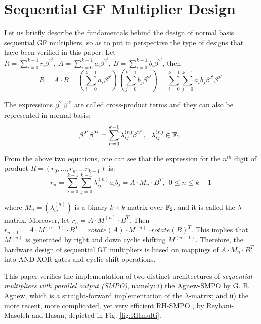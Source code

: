 \section{Sequential GF Multiplier Design}
\label{sec:design}

Let us briefly describe the fundamentals behind the design of normal
basis sequential GF multipliers, so as to put in perspective the type
of designs that have been verified in this paper. Let $R =
\sum_{i=0}^{k-1} r_i \beta^{2^{i}}, ~A = \sum_{i=0}^{k-1} a_i
\beta^{2^{i}}, ~B = \sum_{i=0}^{k-1} b_i \beta^{2^{i}}$, then 
\[
R = A\cdot B = (\sum_{i=0}^{k-1} a_i \beta^{2^{i}}) (\sum_{j=0}^{k-1}
b_j \beta^{2^{j}})  =
\sum_{i=0}^{k-1}\sum_{j=0}^{k-1}a_ib_j\beta^{2^i}\beta^{2^j}\nonumber 
\]

The expressions $\beta^{2^i}\beta^{2^j}$ are called cross-product
terms and they can also be represented in normal basis: 
\begin{displaymath}
\beta^{2^i}\beta^{2^j} =
\sum_{n=0}^{k-1}\lambda_{ij}^{(n)}\beta^{2^n}, \ \ \lambda_{ij}^{(n)}
\in {\mathbb{F}}_{2}. 
\end{displaymath}

From the above two equations, one can see that the expression for the
$n^{th}$ digit of product $R = (r_0, \dots, r_n, \dots r_{k-1})$ is:
\[
r_n = \sum_{i=0}^{k-1}\sum_{j=0}^{k-1}\lambda_{ij}^{(n)}a_ib_j = A
\cdot M_n \cdot B^T, ~~0 \leq n \leq k-1
\]

where $M_n = (\lambda_{ij}^{(n)})$ is a binary $k \times k$ matrix over
${\mathbb{F}}_{2}$, and it is called the $\lambda$-matrix. 
Moreover, let $r_n = A \cdot M^{(n)} \cdot B^T$.
Then $r_{n-1} = A \cdot M^{(n-1)} \cdot B^T = rotate(A) \cdot M^{(n)}
\cdot rotate(B)^T$. This implies that $M^{(n)}$ is generated by right
and down cyclic shifting $M^{(n-1)}$. Therefore, the hardware design
of sequential GF multipliers is based on mappings of $A\cdot M_n
\cdot B^T$ into AND-XOR gates and cyclic shift operations. 

This paper verifies the implementation of two distinct 
architectures of {\it sequential multipliers with parallel output
  (SMPO)}, namely: i) the Agnew-SMPO  \cite{agnew1991implementation}
by G. B. Agnew, which is a straight-forward implementation of the
$\lambda$-matrix; and ii) the more recent, more complicated, yet very
efficient RH-SMPO \cite{RHmulti}, by Reyhani-Masoleh and Hasan,
depicted in Fig. \ref{fig:RHmulti}.  

